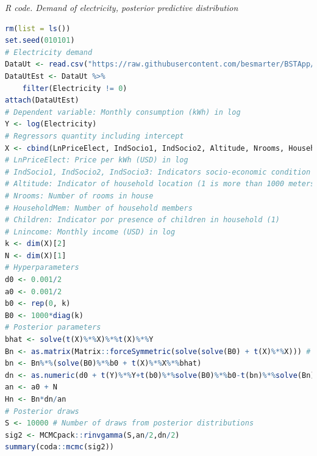 \begin{tcolorbox}[enhanced,width=4.67in,center upper,
	fontupper=\large\bfseries,drop shadow southwest,sharp corners]
	\textit{R code. Demand of electricity, posterior predictive distribution}
	\begin{VF}
		\begin{lstlisting}[language=R]
rm(list = ls())
set.seed(010101)
# Electricity demand
DataUt <- read.csv("https://raw.githubusercontent.com/besmarter/BSTApp/refs/heads/master/DataApp/Utilities.csv", sep = ",", header = TRUE, quote = "")
DataUtEst <- DataUt %>% 
	filter(Electricity != 0)
attach(DataUtEst)
# Dependent variable: Monthly consumption (kWh) in log
Y <- log(Electricity) 
# Regressors quantity including intercept
X <- cbind(LnPriceElect, IndSocio1, IndSocio2, Altitude, Nrooms, HouseholdMem, Children, Lnincome, 1)
# LnPriceElect: Price per kWh (USD) in log
# IndSocio1, IndSocio2, IndSocio3: Indicators socio-economic condition (1) is the lowest and (3) the highest
# Altitude: Indicator of household location (1 is more than 1000 meters above sea level)
# Nrooms: Number of rooms in house
# HouseholdMem: Number of household members
# Children: Indicator por presence of children in household (1)
# Lnincome: Monthly income (USD) in log
k <- dim(X)[2]
N <- dim(X)[1]
# Hyperparameters
d0 <- 0.001/2
a0 <- 0.001/2
b0 <- rep(0, k)
B0 <- 1000*diag(k)
# Posterior parameters
bhat <- solve(t(X)%*%X)%*%t(X)%*%Y
Bn <- as.matrix(Matrix::forceSymmetric(solve(solve(B0) + t(X)%*%X))) # Force this matrix to be symmetric
bn <- Bn%*%(solve(B0)%*%b0 + t(X)%*%X%*%bhat)
dn <- as.numeric(d0 + t(Y)%*%Y+t(b0)%*%solve(B0)%*%b0-t(bn)%*%solve(Bn)%*%bn)
an <- a0 + N
Hn <- Bn*dn/an
# Posterior draws
S <- 10000 # Number of draws from posterior distributions
sig2 <- MCMCpack::rinvgamma(S,an/2,dn/2)
summary(coda::mcmc(sig2))
\end{lstlisting}
	\end{VF}
\end{tcolorbox} 

